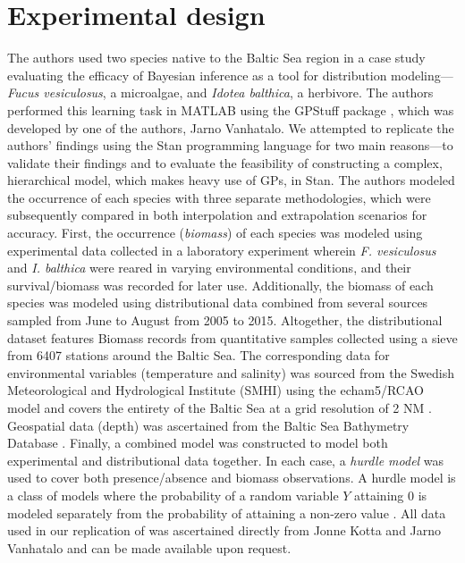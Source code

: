 \documentclass[
  12pt,
  twoside]{book}
\theoremstyle{definition}
\theoremstyle{definition}
\theoremstyle{definition}
\theoremstyle{remark}
\begin{document}
\hypertarget{experimental-design}{%
\section{Experimental design}\label{experimental-design}}

The authors used two species native to the Baltic Sea region in a case study evaluating the efficacy of Bayesian inference as a tool for distribution modeling---\emph{Fucus vesiculosus}, a microalgae, and \emph{Idotea balthica}, a herbivore.
The authors performed this learning task in MATLAB using the GPStuff package \citep{Vanhatalo2015}, which was developed by one of the authors, Jarno Vanhatalo.
We attempted to replicate the authors' findings using the Stan programming language for two main reasons---to validate their findings and to evaluate the feasibility of constructing a complex, hierarchical model, which makes heavy use of GPs, in Stan.
The authors modeled the occurrence of each species with three separate methodologies, which were subsequently compared in both interpolation and extrapolation scenarios for accuracy.
First, the occurrence (\emph{biomass}) of each species was modeled using experimental data collected in a laboratory experiment wherein \emph{F. vesiculosus} and \emph{I. balthica} were reared in varying environmental conditions, and their survival/biomass was recorded for later use.
Additionally, the biomass of each species was modeled using distributional data combined from several sources sampled from June to August from 2005 to 2015.
Altogether, the distributional dataset features Biomass records from quantitative samples collected using a sieve from 6407 stations around the Baltic Sea.
The corresponding data for environmental variables (temperature and salinity) was sourced from the Swedish Meteorological and Hydrological Institute (SMHI) using the echam5/RCAO model and covers the entirety of the Baltic Sea at a grid resolution of 2 NM \citep{Meier2012}.
Geospatial data (depth) was ascertained from the Baltic Sea Bathymetry Database \citep{Bath2021}.
Finally, a combined model was constructed to model both experimental and distributional data together.
In each case, a \emph{hurdle model} was used to cover both presence/absence and biomass observations.
A hurdle model is a class of models where the probability of a random variable \(Y\) attaining 0 is modeled separately from the probability of attaining a non-zero value \citep[  5.6]{StanManual2016}.
All data used in our replication of \citet{Kotta2019} was ascertained directly from Jonne Kotta and Jarno Vanhatalo and can be made available upon request.
\end{document}

